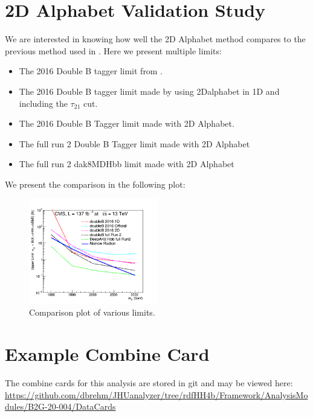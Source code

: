 \section{2D Alphabet Validation Study}
We are interested in knowing how well the 2D Alphabet method compares to the previous method used in \cite{CMS-PAS-B2G-16-026}. Here we present multiple limits:
\begin{itemize}
	\item The 2016 Double B tagger limit from \cite{CMS-PAS-B2G-16-026}.
	\item The 2016 Double B tagger limit made by using 2Dalphabet in 1D and including the $\tau_{21}$ cut.
	\item The 2016 Double B Tagger limit made with 2D Alphabet.
	\item The full run 2 Double B Tagger limit made with 2D Alphabet
	\item The full run 2 dak8MDHbb limit made with 2D Alphabet
\end{itemize}
We present the comparison in the following plot:
\begin{figure}[!htb]
	\centering
	\includegraphics[width=0.5\textwidth]{Figures/limits_HH_combine_137fb_fullrun2_limit_comparison_RadNar.png}
	\caption{Comparison plot of various limits.}
	\label{fig:compplot}
\end{figure}
\section{Example Combine Card}
The combine cards for this analysis are stored in git and may be viewed here: \\
\url{https://github.com/dbrehm/JHUanalyzer/tree/rdfHH4b/Framework/AnalysisModules/B2G-20-004/DataCards}

